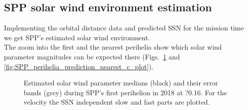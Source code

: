 \subsection{SPP solar wind environment estimation}
Implementing the orbital distance data and predicted SSN for the mission time we get SPP's estimated solar wind environment.\\
The zoom into the first and the nearest perihelia show which solar wind parameter magnitudes can be expected there (Figs.~\ref{fig:SPP_perihelia_prediction_c_plot} and \ref{fig:SPP_perihelia_prediction_nearest_c_plot}).\\
\begin{figure}
	\caption{Estimated solar wind parameter medians (black) and their error bands (grey) during SPP's first perihelion in 2018 at ?\SI{0.16}{\au}. For the velocity the SSN independent slow and fast parts are plotted.}
	\label{fig:SPP_perihelia_prediction_c_plot}
\end{figure}
